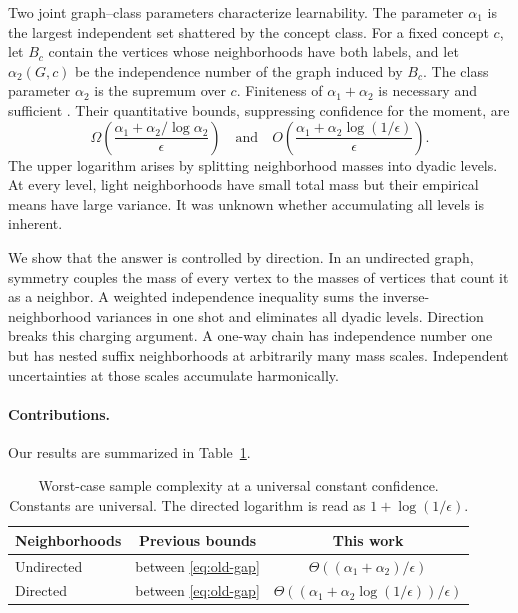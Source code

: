 \documentclass{article}
\newcommand{\1}{\mathbf 1}
\begin{document}
Two joint graph--class parameters characterize learnability. The parameter $\alpha_1$ is the largest independent set shattered by the concept class. For a fixed concept $c$, let $B_c$ contain the vertices whose neighborhoods have both labels, and let $\alpha_2(G,c)$ be the independence number of the graph induced by $B_c$. The class parameter $\alpha_2$ is the supremum over $c$. Finiteness of $\alpha_1+\alpha_2$ is necessary and sufficient \citep{bressan2026}. Their quantitative bounds, suppressing confidence for the moment, are
\begin{equation}
 \Omega\!\left(\frac{\alpha_1+\alpha_2/\log\alpha_2}{\epsilon}\right)
 \quad\text{and}\quad
 O\!\left(\frac{\alpha_1+\alpha_2\log(1/\epsilon)}{\epsilon}\right).
 \label{eq:old-gap}
\end{equation}
The upper logarithm arises by splitting neighborhood masses into dyadic levels. At every level, light neighborhoods have small total mass but their empirical means have large variance. It was unknown whether accumulating all levels is inherent.

We show that the answer is controlled by direction. In an undirected graph, symmetry couples the mass of every vertex to the masses of vertices that count it as a neighbor. A weighted independence inequality sums the inverse-neighborhood variances in one shot and eliminates all dyadic levels. Direction breaks this charging argument. A one-way chain has independence number one but has nested suffix neighborhoods at arbitrarily many mass scales. Independent uncertainties at those scales accumulate harmonically.

\paragraph{Contributions.}
Our results are summarized in Table~\ref{tab:rates}.
\begin{table}[t]
\centering
\caption{Worst-case sample complexity at a universal constant confidence. Constants are universal.
The directed logarithm is read as $1+\log(1/\epsilon)$.}
\label{tab:rates}
\begin{tabular}{lcc}
\toprule
Neighborhoods & Previous bounds & This work \\
\midrule
Undirected & between \eqref{eq:old-gap} & $\Theta((\alpha_1+\alpha_2)/\epsilon)$ \\
Directed & between \eqref{eq:old-gap} & $\Theta((\alpha_1+\alpha_2\log(1/\epsilon))/\epsilon)$ \\
\bottomrule
\end{tabular}
\end{table}
\end{document}
